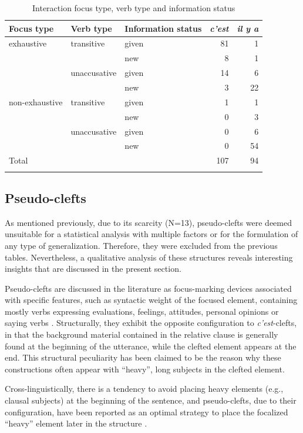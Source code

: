 \begin{table}[H]
\begin{tabular}{lllrr}
\lsptoprule
Focus type & Verb type & Information status & \textit{c'est} & \textit{il y a}\\
\midrule
exhaustive & transitive & given & 81 & 1\\
 &  & new & 8 & 1\\
 & unaccusative & given & 14 & 6\\
 &  & new & 3 & 22\\
 \midrule
non-exhaustive & transitive & given & 1 & 1\\
 &  & new & 0 & 3\\
 & unaccusative & given & 0 & 6\\
 &  & new & 0 & 54\\
\midrule
 {Total} & & & 107 & 94\\
 \lspbottomrule
\end{tabular}
\caption{
Interaction focus type, verb type and information status}
\label{tab:6.9}
\end{table}

\subsection{Pseudo-clefts} \label{sub:6.9.3}
As mentioned previously, due to its scarcity (N=13), pseudo-clefts were deemed unsuitable for a statistical analysis with multiple factors or for the formulation of any type of generalization. Therefore, they were excluded from the previous tables. Nevertheless, a qualitative analysis of these structures reveals interesting insights that are discussed in the present section.

Pseudo-clefts are discussed in the literature as focus-marking devices associated with specific features, such as syntactic weight of the focused element, containing mostly verbs expressing evaluations, feelings, attitudes, personal opinions or saying verbs \parencite{apotheloz2012pseudo}. Structurally, they exhibit the opposite configuration to \textit{c'est}-clefts, in that the background material contained in the relative clause is generally found at the beginning of the utterance, while the clefted element appears at the end. This structural peculiarity has been  claimed to be the reason why these constructions often appear with ``heavy'', long subjects in the clefted element. 

Cross-linguistically, there is a tendency to avoid placing heavy elements (e.g., clausal subjects) at the beginning of the sentence, and pseudo-clefts, due to their configuration, have been reported as an optimal strategy to place the focalized ``heavy” element later in the structure \parencite{prince1978comparison, blanche1990franccais, roubaud2000constructions, calude2009cleft,  apotheloz2012pseudo}. 

